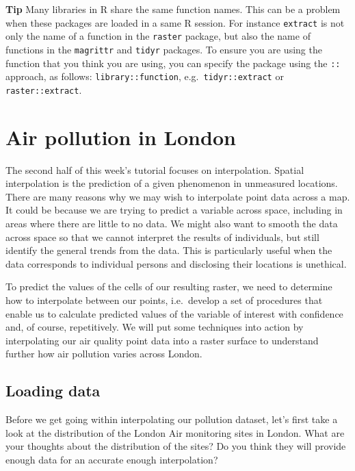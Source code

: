 \documentclass[
]{book}
\begin{document}
\textbf{Tip}
Many libraries in R share the same function names. This can be a problem when these packages are loaded in a same R session. For instance \texttt{extract} is not only the name of a function in the \texttt{raster} package, but also the name of functions in the \texttt{magrittr} and \texttt{tidyr} packages. To ensure you are using the function that you think you are using, you can specify the package using the \texttt{::} approach, as follows: \texttt{library::function}, e.g.~\texttt{tidyr::extract} or \texttt{raster::extract}.

\hypertarget{air-pollution-in-london}{%
\section{Air pollution in London}\label{air-pollution-in-london}}

The second half of this week's tutorial focuses on interpolation. Spatial interpolation is the prediction of a given phenomenon in unmeasured locations. There are many reasons why we may wish to interpolate point data across a map. It could be because we are trying to predict a variable across space, including in areas where there are little to no data. We might also want to smooth the data across space so that we cannot interpret the results of individuals, but still identify the general trends from the data. This is particularly useful when the data corresponds to individual persons and disclosing their locations is unethical.

To predict the values of the cells of our resulting raster, we need to determine how to interpolate between our points, i.e.~develop a set of procedures that enable us to calculate predicted values of the variable of interest with confidence and, of course, repetitively.
We will put some techniques into action by interpolating our air quality point data into a raster surface to understand further how air pollution varies across London.

\hypertarget{loading-data-w09-2}{%
\subsection{Loading data}\label{loading-data-w09-2}}

Before we get going within interpolating our pollution dataset, let's first take a look at the distribution of the London Air monitoring sites in London. What are your thoughts about the distribution of the sites? Do you think they will provide enough data for an accurate enough interpolation?
\end{document}
